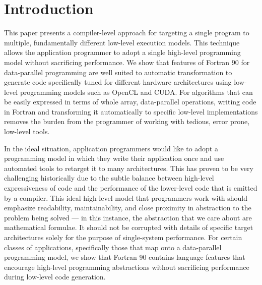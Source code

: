 \section{Introduction}
\label{sec:intro}

This paper presents a compiler-level approach for targeting a single
program to multiple, fundamentally different low-level execution
models.  This technique allows the application programmer to adopt
a single high-level programming model without sacrificing performance.
We show that features of
Fortran 90 for data-parallel programming are well suited to automatic
transformation to generate code specifically tuned for different
hardware architectures using low-level programming models such as
OpenCL and CUDA.  For algorithms that can be easily expressed in terms
of whole array, data-parallel operations, writing code in Fortran and
transforming it automatically to specific low-level implementations
removes the burden from the programmer of working with tedious, error
prone, low-level tools.

In the ideal situation, application programmers would like to adopt a
programming model in which they write their application once and use
automated tools to retarget it to many architectures.  This has proven
to be very challenging historically due to the subtle balance between
high-level expressiveness of code and the performance of the
lower-level code that is emitted by a compiler.  This ideal high-level
model that programmers work with should emphasize readability,
maintainability, and close proximity in abstraction to the problem
being solved --- in this instance, the abstraction that we care about
are mathematical formulae.  It should not be corrupted with details of
specific target architectures solely for the purpose of single-system
performance.  For certain classes of applications, specifically those
that map onto a data-parallel programming model, we show that
Fortran 90 contains language features that encourage high-level
programming abstractions without sacrificing performance during
low-level code generation.


